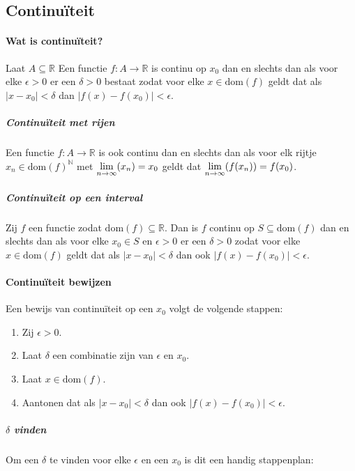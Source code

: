 \subsection{Continuïteit}

\paragraph{Wat is continuïteit?} Laat $A\subseteq\mathbb{R}$ Een functie $f:A\to\mathbb{R}$ is continu op $x_{0}$ dan en slechts dan als voor elke $\epsilon>0$ er een $\delta>0$ bestaat zodat voor elke $x\in\text{dom}(f)$ geldt dat als $|x-x_{0}|<\delta$ dan $|f(x)-f(x_{0})|<\epsilon$.

\subparagraph{Continuïteit met rijen} Een functie $f:A\to\mathbb{R}$ is ook continu dan en slechts dan als voor elk rijtje $x_{n}\in\text{dom}(f)^{\mathbb{N}}$ met $\underset{n\to\infty}{\text{lim}}(x_{n})=x_{0}$ geldt dat $\underset{n\to\infty}{\text{lim}}(f(x_{n}))=f(x_{0})$.

\subparagraph{Continuïteit op een interval} Zij $f$ een functie zodat $\text{dom}(f)\subseteq\mathbb{R}$. Dan is $f$ continu op $S\subseteq\text{dom}(f)$ dan en slechts dan als voor elke $x_{0} \in S$ en $\epsilon>0$ er een $\delta>0$ zodat voor elke $x\in\text{dom}(f)$ geldt dat als $|x-x_{0}|<\delta$ dan ook $|f(x)-f(x_{0})|<\epsilon$.

\paragraph{Continuïteit bewijzen} Een bewijs van continuïteit op een $x_{0}$ volgt de volgende stappen:

\begin{enumerate}
    \setlength\itemsep{0em}
    \item Zij $\epsilon>0$.
    \item Laat $\delta$ een combinatie zijn van $\epsilon$ en $x_{0}$.
    \item Laat $x\in\text{dom}(f)$.
    \item Aantonen dat als $|x-x_{0}|<\delta$ dan ook $|f(x)-f(x_{0})|<\epsilon$.
\end{enumerate}

\subparagraph{$\delta$ vinden} Om een $\delta$ te vinden voor elke $\epsilon$ en een $x_{0}$ is dit een handig stappenplan:

